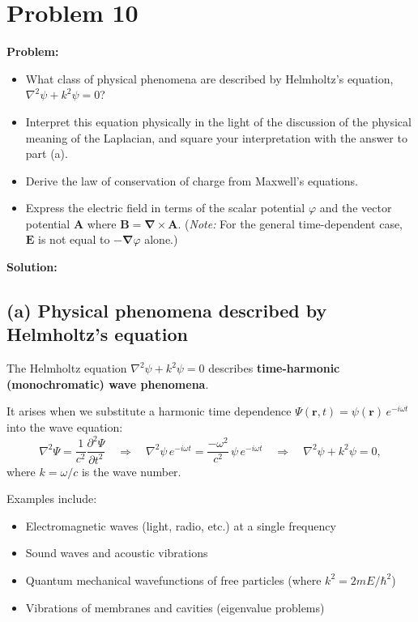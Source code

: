 \documentclass[12pt]{article}
\newcommand{\vect}[1]{\mathbf{#1}}
\newcommand{\grad}{\boldsymbol{\nabla}}
\newcommand{\curl}{\grad\times}
\begin{document}
\section*{Problem 10}

\textbf{Problem:}
\begin{itemize}
\item[(a)] What class of physical phenomena are described by Helmholtz's equation, $\nabla^2\psi + k^2\psi = 0$?
\item[(b)] Interpret this equation physically in the light of the discussion of the physical meaning of the Laplacian, and square your interpretation with the answer to part (a).
\item[(c)] Derive the law of conservation of charge from Maxwell's equations.
\item[(d)] Express the electric field in terms of the scalar potential $\varphi$ and the vector potential $\vect{A}$ where $\vect{B} = \curl\vect{A}$. (\textit{Note:} For the general time-dependent case, $\vect{E}$ is not equal to $-\grad\varphi$ alone.)
\end{itemize}

\bigskip
\textbf{Solution:}

\subsection*{(a) Physical phenomena described by Helmholtz's equation}

The Helmholtz equation $\nabla^2\psi + k^2\psi = 0$ describes \textbf{time-harmonic (monochromatic) wave phenomena}.

It arises when we substitute a harmonic time dependence $\Psi(\vect{r},t) = \psi(\vect{r})\,e^{-i\omega t}$ into the wave equation:
\[
\nabla^2\Psi = \frac{1}{c^2}\frac{\partial^2\Psi}{\partial t^2} \quad \Longrightarrow \quad \nabla^2\psi\,e^{-i\omega t} = \frac{-\omega^2}{c^2}\,\psi\,e^{-i\omega t} \quad \Longrightarrow \quad \nabla^2\psi + k^2\psi = 0,
\]
where $k = \omega/c$ is the wave number.

Examples include:
\begin{itemize}
\item Electromagnetic waves (light, radio, etc.) at a single frequency
\item Sound waves and acoustic vibrations
\item Quantum mechanical wavefunctions of free particles (where $k^2 = 2mE/\hbar^2$)
\item Vibrations of membranes and cavities (eigenvalue problems)
\end{itemize}
\end{document}
